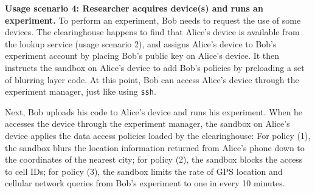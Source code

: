 \textbf{Usage scenario 4: Researcher acquires device(s) and runs an experiment.}
To perform an experiment, Bob needs to request the use of some devices. 
%
The clearinghouse
happens to find that Alice's device is available from the lookup service
(usage scenario 2), and 
assigns Alice's device to Bob's experiment account by placing Bob's
public key on Alice's device. It then instructs 
the sandbox on Alice's device to add Bob's policies by preloading
a set of blurring layer code. At this point, Bob can access Alice's 
device through the experiment manager, just like using \texttt{ssh}.

Next, Bob uploads his code to Alice's device and 
runs his experiment. When he accesses the device through
the experiment manager, the sandbox on Alice's device 
applies the data access policies loaded by the clearinghouse: For 
policy (1), the sandbox blurs the location
information returned from Alice's phone down to the coordinates
of the nearest city; for policy (2), the sandbox blocks the
access to cell IDs; for policy (3), the sandbox limits the rate
of GPS location and cellular network queries from Bob's
experiment to one in every 10 minutes.

